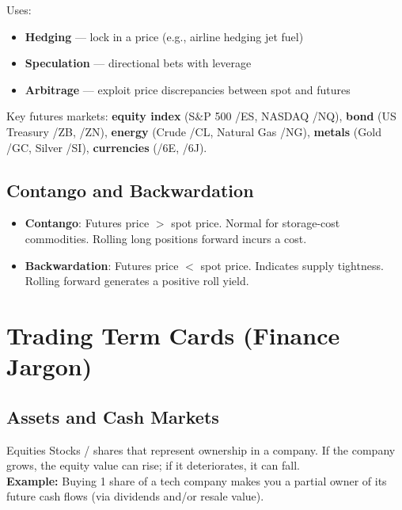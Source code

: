 Uses:
\begin{itemize}
  \item \textbf{Hedging} — lock in a price (e.g., airline hedging jet fuel)
  \item \textbf{Speculation} — directional bets with leverage
  \item \textbf{Arbitrage} — exploit price discrepancies between spot and futures
\end{itemize}

Key futures markets: \textbf{equity index} (S\&P 500 /ES, NASDAQ /NQ),
\textbf{bond} (US Treasury /ZB, /ZN), \textbf{energy} (Crude /CL, Natural Gas /NG),
\textbf{metals} (Gold /GC, Silver /SI), \textbf{currencies} (/6E, /6J).

\subsection{Contango and Backwardation}
\begin{itemize}
  \item \textbf{Contango}: Futures price $>$ spot price. Normal for storage-cost commodities.
        Rolling long positions forward incurs a cost.
  \item \textbf{Backwardation}: Futures price $<$ spot price. Indicates supply tightness.
        Rolling forward generates a positive roll yield.
\end{itemize}

\section{Trading Term Cards (Finance Jargon)}

\subsection{Assets and Cash Markets}

\begin{keyterm}{Equities}
Stocks / shares that represent ownership in a company. If the company grows, the equity
value can rise; if it deteriorates, it can fall.
\\\textbf{Example:} Buying 1 share of a tech company makes you a partial owner of its
future cash flows (via dividends and/or resale value).
\end{keyterm}

